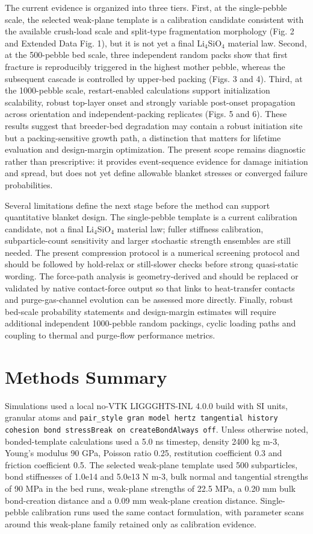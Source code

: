 \documentclass[10pt,twocolumn]{article}
\begin{document}
The current evidence is organized into three tiers. First, at the single-pebble scale, the selected weak-plane template is a calibration candidate consistent with the available crush-load scale and split-type fragmentation morphology (Fig. 2 and Extended Data Fig. 1), but it is not yet a final Li$_4$SiO$_4$ material law. Second, at the 500-pebble bed scale, three independent random packs show that first fracture is reproducibly triggered in the highest mother pebble, whereas the subsequent cascade is controlled by upper-bed packing (Figs. 3 and 4). Third, at the 1000-pebble scale, restart-enabled calculations support initialization scalability, robust top-layer onset and strongly variable post-onset propagation across orientation and independent-packing replicates (Figs. 5 and 6). These results suggest that breeder-bed degradation may contain a robust initiation site but a packing-sensitive growth path, a distinction that matters for lifetime evaluation and design-margin optimization. The present scope remains diagnostic rather than prescriptive: it provides event-sequence evidence for damage initiation and spread, but does not yet define allowable blanket stresses or converged failure probabilities.


Several limitations define the next stage before the method can support quantitative blanket design. The single-pebble template is a current calibration candidate, not a final Li$_4$SiO$_4$ material law; fuller stiffness calibration, subparticle-count sensitivity and larger stochastic strength ensembles are still needed. The present compression protocol is a numerical screening protocol and should be followed by hold-relax or still-slower checks before strong quasi-static wording. The force-path analysis is geometry-derived and should be replaced or validated by native contact-force output so that links to heat-transfer contacts and purge-gas-channel evolution can be assessed more directly. Finally, robust bed-scale probability statements and design-margin estimates will require additional independent 1000-pebble random packings, cyclic loading paths and coupling to thermal and purge-flow performance metrics.


\section{Methods Summary}

Simulations used a local no-VTK LIGGGHTS-INL 4.0.0 build \cite{LIGGGHTSINL} with SI units, granular atoms and \texttt{pair\_style gran model hertz tangential history cohesion bond stressBreak on createBondAlways off}. Unless otherwise noted, bonded-template calculations used a 5.0 ns timestep, density 2400 kg m-3, Young's modulus 90 GPa, Poisson ratio 0.25, restitution coefficient 0.3 and friction coefficient 0.5. The selected weak-plane template used 500 subparticles, bond stiffnesses of 1.0e14 and 5.0e13 N m-3, bulk normal and tangential strengths of 90 MPa in the bed runs, weak-plane strengths of 22.5 MPa, a 0.20 mm bulk bond-creation distance and a 0.09 mm weak-plane creation distance. Single-pebble calibration runs used the same contact formulation, with parameter scans around this weak-plane family retained only as calibration evidence.
\end{document}
